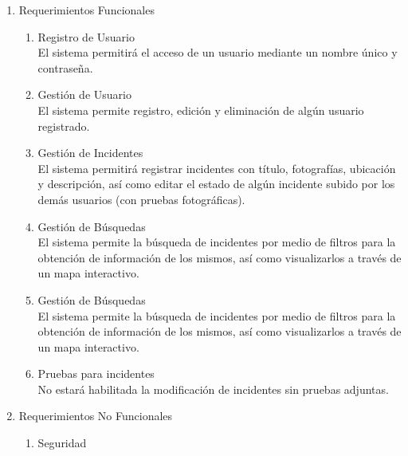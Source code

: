 \documentclass{article}
\begin{document}
\begin{enumerate}

    \item Requerimientos Funcionales
        \begin{enumerate}
            \item Registro de Usuario\\
            El sistema permitirá el acceso de un usuario mediante un nombre único y contraseña.

            \item Gestión de Usuario\\
            El sistema permite registro, edición y eliminación de algún usuario registrado.

            \item Gestión de Incidentes\\
            El sistema permitirá registrar incidentes con título, fotografías, ubicación y descripción, así como editar el estado de algún incidente subido por los demás usuarios (con pruebas fotográficas).

            \item Gestión de Búsquedas\\
            El sistema permite la búsqueda de incidentes por medio de filtros para la obtención de información de los mismos, así como visualizarlos a través de un mapa interactivo.\\

            \item Gestión de Búsquedas\\
            El sistema permite la búsqueda de incidentes por medio de filtros para la obtención de información de los mismos, así como visualizarlos a través de un mapa interactivo.\\

            \item Pruebas para incidentes\\
            No estará habilitada la modificación de incidentes sin pruebas adjuntas.\\
            
        \end{enumerate}

    \item Requerimientos No Funcionales
        \begin{enumerate}
        
            \item Seguridad \\
                \begin{enumerate}
                

\end{enumerate}
\end{enumerate}
\end{enumerate}
\end{document}
